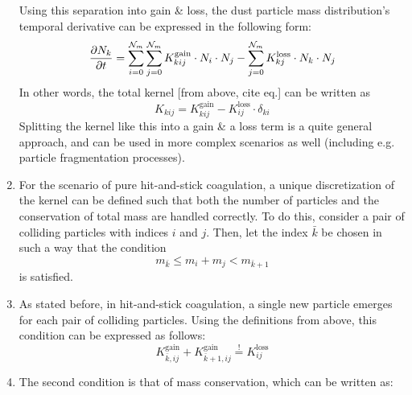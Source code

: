\begin{enumerate}
                Using this separation into gain \& loss, the dust particle mass distribution's
                temporal derivative can be expressed in the following form:
                \begin{equation}
                    \frac{\partial N_k}{\partial t}
                        = \sum_{i=0}^{\mathcal N_m} \sum_{j=0}^{\mathcal N_m}
                            K_{kij}^\text{gain}\cdot N_i\cdot N_j
                        - \sum_{j=0}^{\mathcal N_m} K_{kj}^\text{loss} \cdot N_k\cdot N_j
                \end{equation}
                In other words, the total kernel [from above, cite eq.] can be written as
                \begin{equation}
                    K_{kij} = K_{kij}^\text{gain} - K_{ij}^\text{loss}\cdot\delta_{ki}
                \end{equation}
                Splitting the kernel like this into a gain \& a loss term is a quite general
                approach, and can be used in more complex scenarios as well (including e.g.
                particle fragmentation processes).
            \item For the scenario of pure hit-and-stick coagulation, a unique discretization
                of the kernel can be defined such that both the number of particles and the
                conservation of total mass are handled correctly. To do this, consider a
                pair of colliding particles with indices $i$ and $j$. Then, let the index
                $\bar k$ be chosen in such a way that the condition
                \begin{equation}
                    m_{\bar k} \leq m_i + m_j < m_{\bar k+1}
                \end{equation}
                is satisfied.
            \item As stated before, in hit-and-stick coagulation, a single new particle emerges
                for each pair of colliding particles. Using the definitions from above, this
                condition can be expressed as follows:
                \begin{equation}
                    K_{\bar k,ij}^\text{gain} + K_{\bar k+1,ij}^\text{gain}
                    \overset{!}{=} K_{ij}^\text{loss}
                \end{equation}
            \item The second condition is that of mass conservation, which can be written as:
                \begin{equation}

\end{equation}
\end{enumerate}
